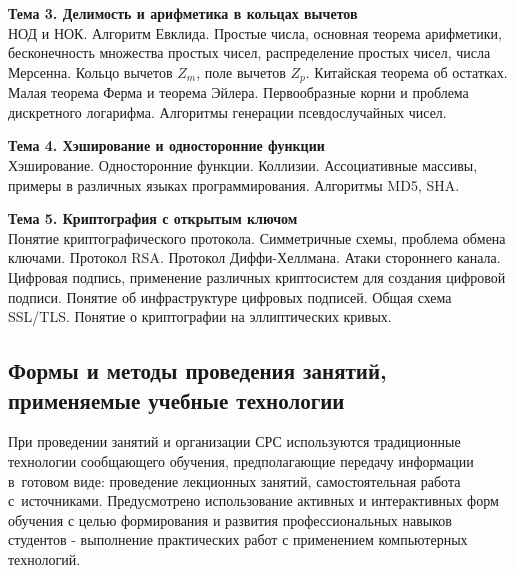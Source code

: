 \documentclass[a4paper,12pt]{article}
\begin{document}
\textbf{Тема 3. Делимость и арифметика в кольцах вычетов	   }\\
НОД и НОК. Алгоритм Евклида. Простые числа, основная теорема арифметики, бесконечность множества простых чисел, распределение простых чисел, числа Мерсенна. Кольцо вычетов $Z_m$, поле вычетов $Z_p$. Китайская теорема об остатках. Малая теорема Ферма и теорема Эйлера. Первообразные корни и проблема дискретного логарифма. Алгоритмы генерации псевдослучайных чисел.

\textbf{Тема 4. Хэширование и односторонние функции             }\\
Хэширование. Односторонние функции. Коллизии. Ассоциативные массивы, примеры в различных языках программирования. Алгоритмы MD5, SHA.

\textbf{Тема 5. Криптография с открытым ключом                  }\\
Понятие криптографического протокола. Симметричные схемы, проблема обмена ключами. Протокол RSA. Протокол Диффи-Хеллмана. Атаки стороннего канала. Цифровая подпись, применение различных криптосистем для создания цифровой подписи. Понятие об инфраструктуре цифровых подписей. Общая схема SSL/TLS. Понятие о криптографии на эллиптических кривых.
 

\subsection{Формы и методы проведения занятий, применяемые учебные технологии}
При проведении занятий и организации СРС используются традиционные технологии сообщающего обучения, предполагающие передачу информации в~готовом виде: проведение лекционных занятий, самостоятельная работа с~источниками. Предусмотрено использование активных и интерактивных форм обучения с целью формирования и развития профессиональных навыков студентов - выполнение практических работ с применением компьютерных технологий. 
\end{document}
